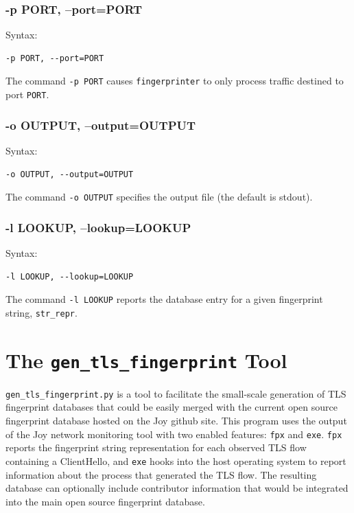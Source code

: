 \documentclass{book}
\begin{document}
\subsection{-p PORT, --port=PORT}
\begin{mdframed}[style=aaa]
Syntax:
  \begin{verbatim}
-p PORT, --port=PORT
  \end{verbatim}
\end{mdframed}
The command \texttt{-p PORT} causes \texttt{fingerprinter} to only process traffic destined to port \texttt{PORT}.

\subsection{-o OUTPUT, --output=OUTPUT}
\begin{mdframed}[style=aaa]
Syntax:
  \begin{verbatim}
-o OUTPUT, --output=OUTPUT
  \end{verbatim}
\end{mdframed}
The command \texttt{-o OUTPUT} specifies the output file (the default is stdout).

\subsection{-l LOOKUP, --lookup=LOOKUP}
\begin{mdframed}[style=aaa]
Syntax:
  \begin{verbatim}
-l LOOKUP, --lookup=LOOKUP
  \end{verbatim}
\end{mdframed}
The command \texttt{-l LOOKUP} reports the database entry for a given fingerprint string, \texttt{str\_repr}.



\chapter{The \texttt{gen\_tls\_fingerprint} Tool}

\texttt{gen\_tls\_fingerprint.py} is a tool to facilitate the small-scale generation of TLS fingerprint databases that could be easily merged with the current open source fingerprint database hosted on the Joy github site. This program uses the output of the Joy network monitoring tool with two enabled features: \texttt{fpx} and \texttt{exe}. \texttt{fpx} reports the fingerprint string representation for each observed TLS flow containing a ClientHello, and \texttt{exe} hooks into the host operating system to report information about the process that generated the TLS flow. The resulting database can optionally include contributor information that would be integrated into the main open source fingerprint database.
\end{document}
